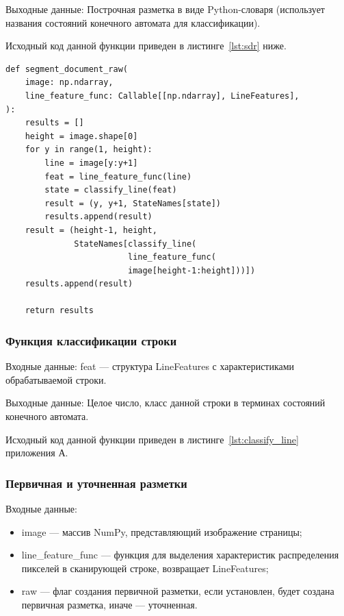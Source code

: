 Выходные данные: Построчная разметка в виде Python-словаря (использует названия состояний конечного автомата для классификации).

Исходный код данной функции приведен в листинге~\ref{lst:sdr} ниже.

\newpage

\begin{lstlisting}[caption={Функия создания построчной разметки (используется для отладки)}, label={lst:sdr}]
def segment_document_raw(
    image: np.ndarray,
    line_feature_func: Callable[[np.ndarray], LineFeatures],
):
    results = []
    height = image.shape[0]
    for y in range(1, height):
        line = image[y:y+1]
        feat = line_feature_func(line)
        state = classify_line(feat)
        result = (y, y+1, StateNames[state])
        results.append(result)
    result = (height-1, height,
              StateNames[classify_line(
                         line_feature_func(
                         image[height-1:height]))])
    results.append(result)

    return results
\end{lstlisting}

\subsubsection{Функция классификации строки} %
Входные данные: feat --- структура LineFeatures с характеристиками обрабатываемой строки.

Выходные данные: Целое число, класс данной строки в терминах состояний конечного автомата.

Исходный код данной функции приведен в листинге~\ref{lst:classify_line} приложения А.

\subsubsection{Первичная и уточненная разметки} %
Входные данные:
\begin{itemize}
    \item image --- массив NumPy, представляющий изображение страницы;
    \item line\_feature\_func --- функция для выделения характеристик распределения пикселей в сканирующей строке, возвращает LineFeatures;
    \item raw --- флаг создания первичной разметки, если установлен, будет создана первичная разметка, иначе --- уточненная.
\end{itemize}


